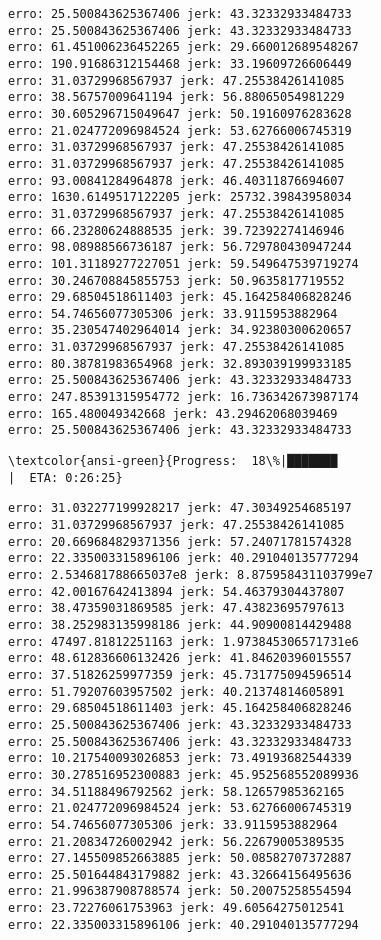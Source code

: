\documentclass[11pt]{article}
\begin{document}
    \begin{Verbatim}[commandchars=\\\{\}]
erro: 25.500843625367406 jerk: 43.32332933484733
erro: 25.500843625367406 jerk: 43.32332933484733
erro: 61.451006236452265 jerk: 29.660012689548267
erro: 190.91686312154468 jerk: 33.19609726606449
erro: 31.03729968567937 jerk: 47.25538426141085
erro: 38.56757009641194 jerk: 56.88065054981229
erro: 30.605296715049647 jerk: 50.19160976283628
erro: 21.024772096984524 jerk: 53.62766006745319
erro: 31.03729968567937 jerk: 47.25538426141085
erro: 31.03729968567937 jerk: 47.25538426141085
erro: 93.00841284964878 jerk: 46.40311876694607
erro: 1630.6149517122205 jerk: 25732.39843958034
erro: 31.03729968567937 jerk: 47.25538426141085
erro: 66.23280624888535 jerk: 39.72392274146946
erro: 98.08988566736187 jerk: 56.729780430947244
erro: 101.31189277227051 jerk: 59.549647539719274
erro: 30.246708845855753 jerk: 50.9635817719552
erro: 29.68504518611403 jerk: 45.164258406828246
erro: 54.74656077305306 jerk: 33.9115953882964
erro: 35.230547402964014 jerk: 34.92380300620657
erro: 31.03729968567937 jerk: 47.25538426141085
erro: 80.38781983654968 jerk: 32.893039199933185
erro: 25.500843625367406 jerk: 43.32332933484733
erro: 247.85391315954772 jerk: 16.736342673987174
erro: 165.480049342668 jerk: 43.29462068039469
erro: 25.500843625367406 jerk: 43.32332933484733

    \end{Verbatim}

    \begin{Verbatim}[commandchars=\\\{\}]
\textcolor{ansi-green}{Progress:  18\%|███████                                  |  ETA: 0:26:25}
    \end{Verbatim}

    \begin{Verbatim}[commandchars=\\\{\}]
erro: 31.032277199928217 jerk: 47.30349254685197
erro: 31.03729968567937 jerk: 47.25538426141085
erro: 20.669684829371356 jerk: 57.24071781574328
erro: 22.335003315896106 jerk: 40.291040135777294
erro: 2.534681788665037e8 jerk: 8.875958431103799e7
erro: 42.00167642413894 jerk: 54.46379304437807
erro: 38.47359031869585 jerk: 47.43823695797613
erro: 38.252983135998186 jerk: 44.90900814429488
erro: 47497.81812251163 jerk: 1.973845306571731e6
erro: 48.612836606132426 jerk: 41.84620396015557
erro: 37.51826259977359 jerk: 45.731775094596514
erro: 51.79207603957502 jerk: 40.21374814605891
erro: 29.68504518611403 jerk: 45.164258406828246
erro: 25.500843625367406 jerk: 43.32332933484733
erro: 25.500843625367406 jerk: 43.32332933484733
erro: 10.217540093026853 jerk: 73.49193682544339
erro: 30.278516952300883 jerk: 45.952568552089936
erro: 34.51188496792562 jerk: 58.12657985362165
erro: 21.024772096984524 jerk: 53.62766006745319
erro: 54.74656077305306 jerk: 33.9115953882964
erro: 21.20834726002942 jerk: 56.22679005389535
erro: 27.145509852663885 jerk: 50.08582707372887
erro: 25.501644843179882 jerk: 43.32664156495636
erro: 21.996387908788574 jerk: 50.20075258554594
erro: 23.72276061753963 jerk: 49.60564275012541
erro: 22.335003315896106 jerk: 40.291040135777294

    \end{Verbatim}
\end{document}
